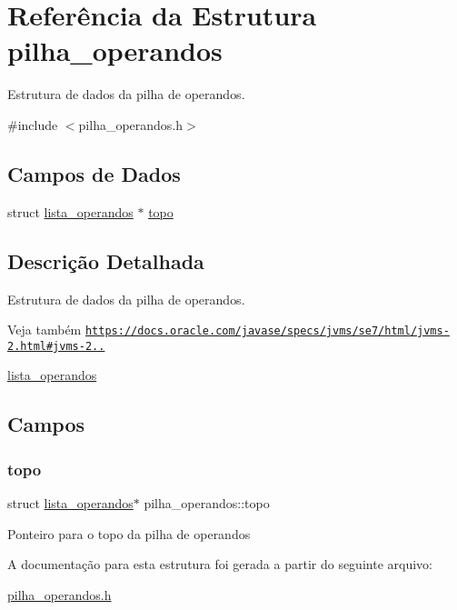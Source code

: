 \hypertarget{structpilha__operandos}{}\section{Referência da Estrutura pilha\+\_\+operandos}
\label{structpilha__operandos}


Estrutura de dados da pilha de operandos.  




{\ttfamily \#include $<$pilha\+\_\+operandos.\+h$>$}

\subsection*{Campos de Dados}
\begin{DoxyCompactItemize}
\item 
struct \hyperlink{structlista__operandos}{lista\+\_\+operandos} $\ast$ \hyperlink{structpilha__operandos_a993dd7722eed1663f266c36ecf0b8417}{topo}
\end{DoxyCompactItemize}


\subsection{Descrição Detalhada}
Estrutura de dados da pilha de operandos. 

\begin{DoxySeeAlso}{Veja também}
\href{https://docs.oracle.com/javase/specs/jvms/se7/html/jvms-2.html#jvms-2.6.2}{\tt https\+://docs.\+oracle.\+com/javase/specs/jvms/se7/html/jvms-\/2.\+html\#jvms-\/2..} 

\hyperlink{structlista__operandos}{lista\+\_\+operandos} 
\end{DoxySeeAlso}


\subsection{Campos}
\mbox{\label{structpilha__operandos_a993dd7722eed1663f266c36ecf0b8417}} 
\subsubsection{\texorpdfstring{topo}{topo}}
{\footnotesize\ttfamily struct \hyperlink{structlista__operandos}{lista\+\_\+operandos}$\ast$ pilha\+\_\+operandos\+::topo}

Ponteiro para o topo da pilha de operandos 

A documentação para esta estrutura foi gerada a partir do seguinte arquivo\+:\begin{DoxyCompactItemize}
\item 
\hyperlink{pilha__operandos_8h}{pilha\+\_\+operandos.\+h}\end{DoxyCompactItemize}
